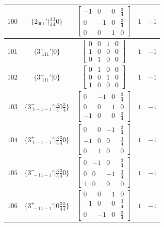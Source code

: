 \documentclass[fleqn,8pt]{jsarticle}
\begin{document}
\begin{longtable}{ccccc}
$ 100 $ & $ \{2{}_{001}{}'|\frac{3}{4} \frac{3}{4} 0\} $ & $ \begin{bmatrix} -1 & 0 & 0 & \frac{3}{4} \\ 0 & -1 & 0 & \frac{3}{4} \\ 0 & 0 & 1 & 0 \end{bmatrix} $ & $ 1 $ & $ -1 $ \\ \hline
$ 101 $ & $ \{3^{+}_{\,\,111}{}'|0\} $ & $ \begin{bmatrix} 0 & 0 & 1 & 0 \\ 1 & 0 & 0 & 0 \\ 0 & 1 & 0 & 0 \end{bmatrix} $ & $ 1 $ & $ -1 $ \\ \hline
$ 102 $ & $ \{3^{-}_{\,\,111}{}'|0\} $ & $ \begin{bmatrix} 0 & 1 & 0 & 0 \\ 0 & 0 & 1 & 0 \\ 1 & 0 & 0 & 0 \end{bmatrix} $ & $ 1 $ & $ -1 $ \\ \hline
$ 103 $ & $ \{3^{-}_{\,\,1-1-1}{}'|\frac{3}{4} 0 \frac{3}{4}\} $ & $ \begin{bmatrix} 0 & -1 & 0 & \frac{3}{4} \\ 0 & 0 & 1 & 0 \\ -1 & 0 & 0 & \frac{3}{4} \end{bmatrix} $ & $ 1 $ & $ -1 $ \\ \hline
$ 104 $ & $ \{3^{+}_{\,\,1-1-1}{}'|\frac{3}{4} \frac{3}{4} 0\} $ & $ \begin{bmatrix} 0 & 0 & -1 & \frac{3}{4} \\ -1 & 0 & 0 & \frac{3}{4} \\ 0 & 1 & 0 & 0 \end{bmatrix} $ & $ 1 $ & $ -1 $ \\ \hline
$ 105 $ & $ \{3^{-}_{\,\,-11-1}{}'|\frac{3}{4} \frac{3}{4} 0\} $ & $ \begin{bmatrix} 0 & -1 & 0 & \frac{3}{4} \\ 0 & 0 & -1 & \frac{3}{4} \\ 1 & 0 & 0 & 0 \end{bmatrix} $ & $ 1 $ & $ -1 $ \\ \hline
$ 106 $ & $ \{3^{+}_{\,\,-11-1}{}'|0 \frac{3}{4} \frac{3}{4}\} $ & $ \begin{bmatrix} 0 & 0 & 1 & 0 \\ -1 & 0 & 0 & \frac{3}{4} \\ 0 & -1 & 0 & \frac{3}{4} \end{bmatrix} $ & $ 1 $ & $ -1 $ \\ \hline

\end{longtable}
\end{document}
